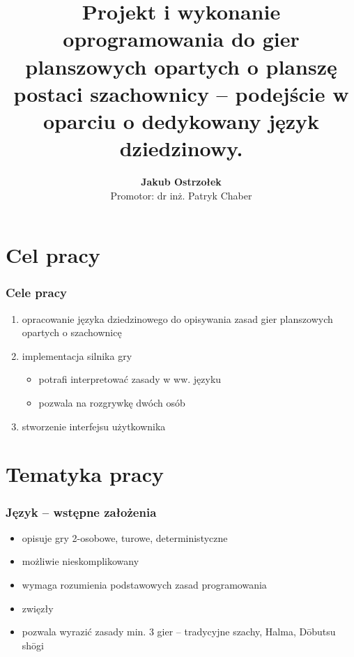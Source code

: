 \documentclass{beamer}
\title[Silnik gier opartych o szachownicę \insertframenumber/\inserttotalframenumber]{
   Projekt i wykonanie oprogramowania do gier planszowych opartych
   o planszę postaci szachownicy -- podejście w oparciu o dedykowany
   język dziedzinowy.}
\author[Jakub Ostrzołek]{\textbf{Jakub Ostrzołek} \\%
\footnotesize Promotor: dr inż. Patryk Chaber}
\institute{Instytut Automatyki i Informatyki Stosowanej\\%
Politechnika Warszawska}
\begin{document}
\frame{\titlepage}


\section{Cel pracy}

\begin{frame}
	\frametitle{Cele pracy}
	\begin{enumerate}
		\item opracowanie języka dziedzinowego do opisywania zasad gier planszowych opartych o szachownicę
		\item implementacja silnika gry
		      \begin{itemize}
			      \item potrafi interpretować zasady w ww. języku
			      \item pozwala na rozgrywkę dwóch osób
		      \end{itemize}
		\item stworzenie interfejsu użytkownika
	\end{enumerate}
\end{frame}

\section{Tematyka pracy}

\begin{frame}
	\frametitle{Język -- wstępne założenia}
	\begin{itemize}
		\item opisuje gry 2-osobowe, turowe, deterministyczne
		\item możliwie nieskomplikowany
		\item wymaga rozumienia podstawowych zasad programowania
		\item zwięzły
		\item pozwala wyrazić zasady min. 3 gier -- tradycyjne szachy, Halma, Dōbutsu shōgi
	\end{itemize}
\end{frame}
\end{document}
